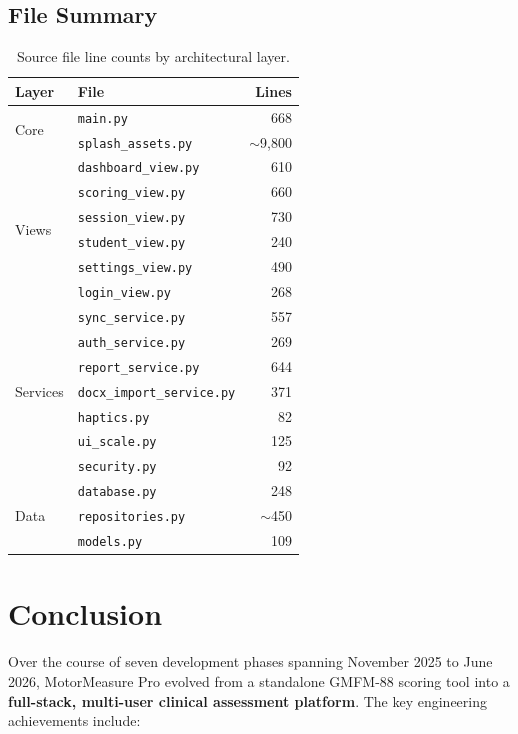 \documentclass[12pt,a4paper]{article}
\begin{document}
\subsection{File Summary}

\begin{table}[H]
\centering
\begin{tabular}{@{}llr@{}}
\toprule
\textbf{Layer} & \textbf{File} & \textbf{Lines} \\
\midrule
\multirow{2}{*}{Core}
  & \texttt{main.py} & 668 \\
  & \texttt{splash\_assets.py} & $\sim$9,800 \\
\midrule
\multirow{6}{*}{Views}
  & \texttt{dashboard\_view.py} & 610 \\
  & \texttt{scoring\_view.py} & 660 \\
  & \texttt{session\_view.py} & 730 \\
  & \texttt{student\_view.py} & 240 \\
  & \texttt{settings\_view.py} & 490 \\
  & \texttt{login\_view.py} & 268 \\
\midrule
\multirow{7}{*}{Services}
  & \texttt{sync\_service.py} & 557 \\
  & \texttt{auth\_service.py} & 269 \\
  & \texttt{report\_service.py} & 644 \\
  & \texttt{docx\_import\_service.py} & 371 \\
  & \texttt{haptics.py} & 82 \\
  & \texttt{ui\_scale.py} & 125 \\
  & \texttt{security.py} & 92 \\
\midrule
\multirow{3}{*}{Data}
  & \texttt{database.py} & 248 \\
  & \texttt{repositories.py} & $\sim$450 \\
  & \texttt{models.py} & 109 \\
\bottomrule
\end{tabular}
\caption{Source file line counts by architectural layer.}
\end{table}

\section{Conclusion}

Over the course of seven development phases spanning November 2025 to June 2026, MotorMeasure Pro evolved from a standalone GMFM-88 scoring tool into a \textbf{full-stack, multi-user clinical assessment platform}. The key engineering achievements include:
\end{document}
